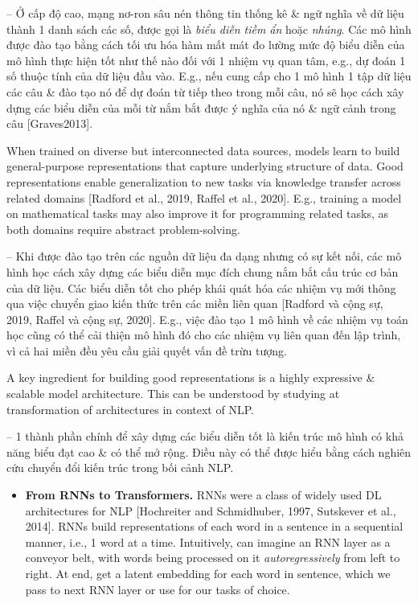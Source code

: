 \documentclass{article}
\begin{document}
\begin{itemize}
    -- Ở cấp độ cao, mạng nơ-ron sâu nén thông tin thống kê \& ngữ nghĩa về dữ liệu thành 1 danh sách các số, được gọi là {\it biểu diễn tiềm ẩn} hoặc {\it nhúng}. Các mô hình được đào tạo bằng cách tối ưu hóa hàm mất mát đo lường mức độ biểu diễn của mô hình thực hiện tốt như thế nào đối với 1 nhiệm vụ quan tâm, e.g., dự đoán 1 số thuộc tính của dữ liệu đầu vào. E.g., nếu cung cấp cho 1 mô hình 1 tập dữ liệu các câu \& đào tạo nó để dự đoán từ tiếp theo trong mỗi câu, nó sẽ học cách xây dựng các biểu diễn của mỗi từ nắm bắt được ý nghĩa của nó \& ngữ cảnh trong câu [Graves2013].
    
    When trained on diverse but interconnected data sources, models learn to build general-purpose representations that capture underlying structure of data. Good representations enable generalization to new tasks via knowledge transfer across related domains [Radford et al., 2019, Raffel et al., 2020]. E.g., training a model on mathematical tasks may also improve it for programming related tasks, as both domains require abstract problem-solving.
    
    -- Khi được đào tạo trên các nguồn dữ liệu đa dạng nhưng có sự kết nối, các mô hình học cách xây dựng các biểu diễn mục đích chung nắm bắt cấu trúc cơ bản của dữ liệu. Các biểu diễn tốt cho phép khái quát hóa các nhiệm vụ mới thông qua việc chuyển giao kiến thức trên các miền liên quan [Radford và cộng sự, 2019, Raffel và cộng sự, 2020]. E.g., việc đào tạo 1 mô hình về các nhiệm vụ toán học cũng có thể cải thiện mô hình đó cho các nhiệm vụ liên quan đến lập trình, vì cả hai miền đều yêu cầu giải quyết vấn đề trừu tượng.
    
    A key ingredient for building good representations is a highly expressive \& scalable model architecture. This can be understood by studying at transformation of architectures in context of NLP.
    
    -- 1 thành phần chính để xây dựng các biểu diễn tốt là kiến trúc mô hình có khả năng biểu đạt cao \& có thể mở rộng. Điều này có thể được hiểu bằng cách nghiên cứu chuyển đổi kiến trúc trong bối cảnh NLP.
    \begin{itemize}
        \item {\bf From RNNs to Transformers.} RNNs were a class of widely used DL architectures for NLP [Hochreiter and Schmidhuber, 1997, Sutskever et al., 2014]. RNNs build representations of each word in a sentence in a sequential manner, i.e., 1 word at a time. Intuitively, can imagine an RNN layer as a conveyor belt, with words being processed on it {\it autoregressively} from left to right. At end, get a latent embedding for each word in sentence, which we pass to next RNN layer or use for our tasks of choice.
        

\end{itemize}
\end{itemize}
\end{document}
